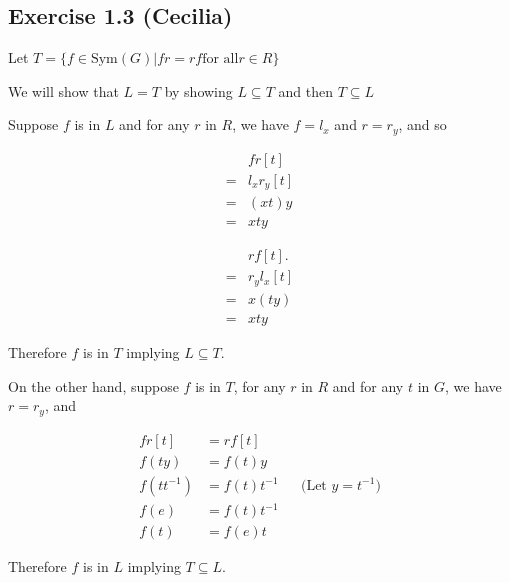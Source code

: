 \subsection*{Exercise 1.3 (Cecilia)}

Let $T = \{f \in \text{Sym}(G) | fr = rf \text{for all} r \in R \}$

We will show that $L = T$ by showing $ L \subseteq T $ and then $ T \subseteq L $

Suppose $f$ is in $L$ and for any $r$ in $R$, we have $f = l_x $ and $ r= r_y $, and so

\begin{align*}
   & fr[t]       \\
  =& l_x r_y [t] \\
  =& (xt)y       \\
  =& xty
\end{align*}

\begin{align*}
   & rf[t].      \\
  =& r_y l_x [t] \\
  =& x(ty)       \\
  =& xty
\end{align*}

Therefore $f$ is in $T$ implying $ L \subseteq T $.

On the other hand, suppose $f$ is in $T$, for any $r$ in $R$ and for any $t$ in $G$, we have $r = r_y$, and

\begin{align*}
       fr[t] &= rf[t]                                          \\
       f(ty) &= f(t)y                                          \\
  f(tt^{-1}) &= f(t)t^{-1} && \text{(Let } y = t^{-1} \text{)} \\
        f(e) &= f(t)t^{-1}                                     \\
        f(t) &= f(e)t
\end{align*}

Therefore $f$ is in $L$ implying $ T \subseteq L$.